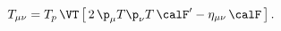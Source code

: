\begin{equation}
 T_{\mu\nu}= T_p\,\VT\left[\,2\,\p_\mu T \p_\nu T\, \calF'
        - \eta_{\mu\nu}\,\calF\,\right]. \label{EM}
\end{equation}

